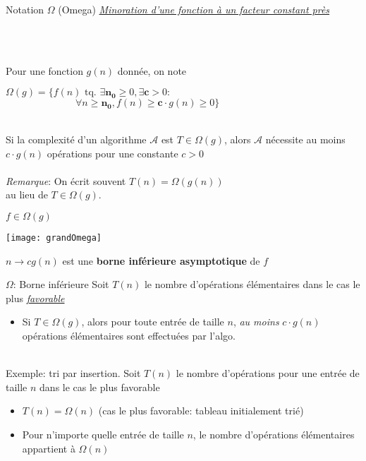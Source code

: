 \begin{frame}{Notation $\Omega$ (Omega)}
  \underline{\emph{Minoration d'une fonction à un facteur constant
      près}}

~\\
~\\
  \begin{definition}
 Pour une fonction $g(n)$ donnée, on note 

$\Omega(g) = \{f(n) \mbox{ tq. } \exists \mathbf{n_0} \geq 0, \exists
\mathbf{c} > 0:$ \\
$~~~~~~~~~~~~~~~~~~~~~~~~~~~~~~~~\forall n \geq \mathbf{n_0}, f(n)
\geq \mathbf{c}\cdot{}g(n) \geq 0\}$
  \end{definition}

~\\
 Si la complexité d'un algorithme $\mathcal{A}$ est $T \in \Omega(g)$,
    alors $\mathcal{A}$ nécessite au moins $c\cdot{}g(n)$ opérations pour une constante
    $c > 0$
~\\~\\

\emph{Remarque}: On écrit souvent $T(n) = \Omega(g(n))$ \\ au lieu de $T \in
\Omega(g)$. 
\end{frame}

\begin{frame}{$f \in \Omega(g)$}

\texttt{[image: grandOmega]}  

$n \rightarrow cg(n)$  est une \textbf{borne inférieure asymptotique} de $f$
\end{frame}

\begin{frame}{$\Omega$: Borne inférieure}
  Soit $T(n)$ le nombre d'opérations élémentaires dans le cas le plus \underline{\emph{favorable}}
  \begin{itemize}
  \item Si $T \in \Omega(g)$, alors  pour toute  entrée de taille $n$, \emph{au
    moins} $c\cdot{} g(n)$ opérations élémentaires sont effectuées par l'algo.
  \end{itemize}
~\\
Exemple: tri par insertion. Soit $T(n)$ le nombre
d'opérations pour une entrée de taille $n$ dans le cas le plus favorable
\begin{itemize}
\item $T(n) = \Omega(n)$ (cas le plus favorable: tableau initialement trié)
\item Pour n'importe quelle entrée de taille $n$, le nombre
  d'opérations élémentaires appartient à $\Omega(n)$
\end{itemize}
\end{frame}


